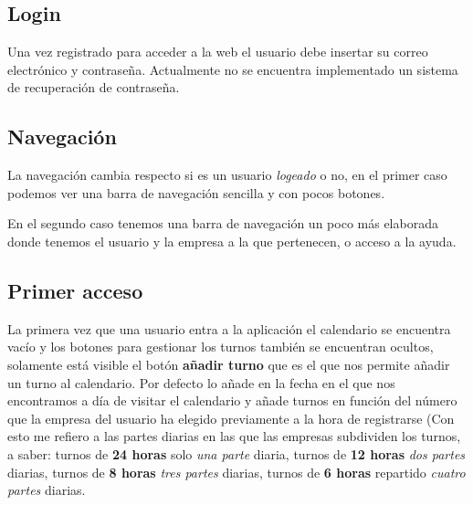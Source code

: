 \subsection{Login}

Una vez registrado para acceder a la web el usuario debe insertar su correo electrónico y contraseña. Actualmente no se encuentra implementado un sistema de recuperación de contraseña.


\subsection{Navegación}

La navegación cambia respecto si es un usuario \emph{logeado} o no, en el primer caso podemos ver una barra de navegación sencilla y con pocos botones.


En el segundo caso tenemos una barra de navegación un poco más elaborada donde tenemos el usuario y la empresa a la que pertenecen, o acceso a la ayuda.




\subsection{Primer acceso}
La primera vez que una usuario entra a la aplicación el calendario se encuentra vacío y los botones para gestionar los turnos también se encuentran ocultos, solamente está visible el botón \textbf{añadir turno} que es el que nos permite añadir un turno al calendario. Por defecto lo añade en la fecha en el que nos encontramos a día de visitar el calendario y añade turnos en función del número que la empresa del usuario ha elegido previamente a la hora de registrarse (Con esto me refiero a las partes diarias en las que las empresas subdividen los turnos, a saber: turnos de \textbf{ 24 horas} solo \emph{una parte} diaria, turnos de \textbf{12 horas} \emph{dos partes} diarias, turnos de \textbf{8 horas} \emph{tres partes} diarias, turnos de \textbf{6 horas} repartido \emph{cuatro partes} diarias.



